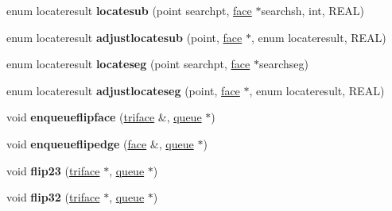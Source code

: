 \begin{DoxyCompactItemize}
\item 
\hypertarget{classtetgenmesh_ad9ec0ea733fc32c21b4b6f2aa0b01bfb}{enum locateresult {\bfseries locatesub} (point searchpt, \hyperlink{classtetgenmesh_1_1face}{face} $\ast$searchsh, int, R\-E\-A\-L)}\label{classtetgenmesh_ad9ec0ea733fc32c21b4b6f2aa0b01bfb}

\item 
\hypertarget{classtetgenmesh_a6dd764e931e8c578885e2bfbdd85ae9e}{enum locateresult {\bfseries adjustlocatesub} (point, \hyperlink{classtetgenmesh_1_1face}{face} $\ast$, enum locateresult, R\-E\-A\-L)}\label{classtetgenmesh_a6dd764e931e8c578885e2bfbdd85ae9e}

\item 
\hypertarget{classtetgenmesh_a685dc2ef858beb741a50881685fb0f35}{enum locateresult {\bfseries locateseg} (point searchpt, \hyperlink{classtetgenmesh_1_1face}{face} $\ast$searchseg)}\label{classtetgenmesh_a685dc2ef858beb741a50881685fb0f35}

\item 
\hypertarget{classtetgenmesh_af44f90c7a8af69a905faf662b1e92e49}{enum locateresult {\bfseries adjustlocateseg} (point, \hyperlink{classtetgenmesh_1_1face}{face} $\ast$, enum locateresult, R\-E\-A\-L)}\label{classtetgenmesh_af44f90c7a8af69a905faf662b1e92e49}

\item 
\hypertarget{classtetgenmesh_ab06c241d0609e181bee2ce5c76df037d}{void {\bfseries enqueueflipface} (\hyperlink{classtetgenmesh_1_1triface}{triface} \&, \hyperlink{classtetgenmesh_1_1queue}{queue} $\ast$)}\label{classtetgenmesh_ab06c241d0609e181bee2ce5c76df037d}

\item 
\hypertarget{classtetgenmesh_a3b3ef95519e2e1ba5fe4a96824449eb4}{void {\bfseries enqueueflipedge} (\hyperlink{classtetgenmesh_1_1face}{face} \&, \hyperlink{classtetgenmesh_1_1queue}{queue} $\ast$)}\label{classtetgenmesh_a3b3ef95519e2e1ba5fe4a96824449eb4}

\item 
\hypertarget{classtetgenmesh_a8a2b6437c0187819e0460f66c0c0f300}{void {\bfseries flip23} (\hyperlink{classtetgenmesh_1_1triface}{triface} $\ast$, \hyperlink{classtetgenmesh_1_1queue}{queue} $\ast$)}\label{classtetgenmesh_a8a2b6437c0187819e0460f66c0c0f300}

\item 
\hypertarget{classtetgenmesh_a6459be2e39f2dda2192b445661258cd4}{void {\bfseries flip32} (\hyperlink{classtetgenmesh_1_1triface}{triface} $\ast$, \hyperlink{classtetgenmesh_1_1queue}{queue} $\ast$)}\label{classtetgenmesh_a6459be2e39f2dda2192b445661258cd4}


\end{DoxyCompactItemize}
